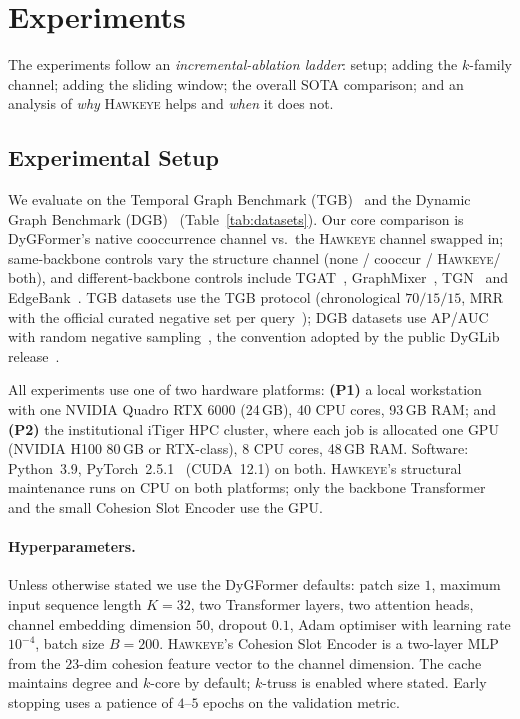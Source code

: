 \documentclass[sigconf,nonacm,review]{acmart}
\newcommand{\method}{\textsc{Hawkeye}\xspace}
\begin{document}
\section{Experiments}
\label{sec:exp}

The experiments follow an \emph{incremental-ablation ladder}: setup; adding the
$k$-family channel; adding the sliding window; the overall SOTA comparison; and
an analysis of \emph{why} \method helps and \emph{when} it does not.

\subsection{Experimental Setup}
We evaluate on the Temporal Graph Benchmark (TGB)~\cite{huang2023tgb} and the
Dynamic Graph Benchmark (DGB)~\cite{poursafaei2022edgebank}
(Table~\ref{tab:datasets}). Our core comparison is DyGFormer's native
cooccurrence channel vs.\ the \method channel swapped in; same-backbone
controls vary the structure channel (none / cooccur / \method / both), and
different-backbone controls include TGAT~\cite{xu2020tgat},
GraphMixer~\cite{cong2023graphmixer}, TGN~\cite{rossi2020tgn} and
EdgeBank~\cite{poursafaei2022edgebank}. TGB datasets use the TGB protocol
(chronological $70/15/15$, MRR with the official curated negative set
per query~\cite{huang2023tgb}); DGB datasets use AP/AUC with random
negative sampling~\cite{mikolov2013negative,poursafaei2022edgebank},
the convention adopted by the public DyGLib release~\cite{yu2023dygformer}.

All experiments use one of two hardware platforms: \textbf{(P1)} a local
workstation with one NVIDIA Quadro RTX 6000 (24\,GB), 40 CPU cores, 93\,GB
RAM; and \textbf{(P2)} the institutional iTiger HPC cluster, where each job
is allocated one GPU (NVIDIA H100 80\,GB or RTX-class), 8 CPU cores, 48\,GB
RAM. Software: Python~3.9, PyTorch~2.5.1~\cite{paszke2019pytorch}
(CUDA~12.1) on both. \method's structural maintenance runs on CPU on both
platforms; only the backbone Transformer and the small Cohesion Slot
Encoder use the GPU.

\paragraph{Hyperparameters.}
Unless otherwise stated we use the DyGFormer defaults: patch size $1$,
maximum input sequence length $K=32$, two Transformer layers, two
attention heads, channel embedding dimension $50$, dropout $0.1$, Adam
optimiser with learning rate $10^{-4}$, batch size $B=200$. \method's
Cohesion Slot Encoder is a two-layer MLP from the $23$-dim cohesion
feature vector to the channel dimension. The cache maintains degree and
$k$-core by default; $k$-truss is enabled where stated. Early stopping
uses a patience of $4$--$5$ epochs on the validation metric.
\end{document}
